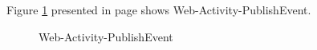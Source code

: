 \documentclass[12pt,a4paper,class,twoside,openany]{report}
\begin{document}
{Figure \ref{fg:4-3} presented in page \pageref{fg:4-3} shows Web-Activity-PublishEvent.
\begin{figure}
\begin{center}
\caption{Web-Activity-PublishEvent}
\label{fg:4-3}
\end{center}
\end{figure}


}
\end{document}
